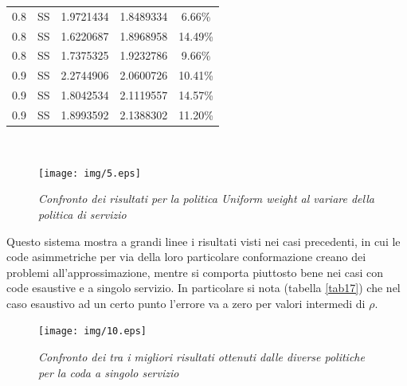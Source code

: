 \documentclass[12pt,a4paper,italian]{article}
\begin{document}
\begin{table}[ht!]
\begin{minipage}[b]{0.48\linewidth}
\begin{tabular}{c c c c c}
			 0.8 & SS & 1.9721434 &   1.8489334    & 6.66\%  \\
			 0.8 & SS & 1.6220687 &   1.8968958    & 14.49\% \\
			 0.8 & SS & 1.7375325 &   1.9232786    & 9.66\%  \\ \hline \hline
			 0.9 & SS & 2.2744906 &   2.0600726    & 10.41\% \\
			 0.9 & SS & 1.8042534 &   2.1119557    & 14.57\% \\
			 0.9 & SS & 1.8993592 &   2.1388302    & 11.20\% \\\hline
			
		\end{tabular}
		
	\end{minipage}
\end{table}
\ \ \
\newpage
\begin{figure}[ht!]
	\centering
	\texttt{[image: img/5.eps]}
	\caption{\emph{Confronto dei risultati per la politica Uniform weight al variare della politica di servizio}}
\end{figure}
Questo sistema mostra a grandi linee i risultati visti nei casi precedenti, in cui le code asimmetriche per via della loro particolare conformazione creano dei problemi all'approssimazione, mentre si comporta piuttosto bene nei casi con code esaustive e a singolo servizio. In particolare si nota (tabella \ref{tab17}) che nel caso esaustivo ad un certo punto l'errore va a zero per valori intermedi di $\rho$.
\begin{figure}[ht!]
	\centering
	\texttt{[image: img/10.eps]}
	\caption{\emph{Confronto dei tra i migliori risultati ottenuti dalle diverse politiche per la coda a singolo servizio}}
\end{figure}
\newpage
\end{document}

